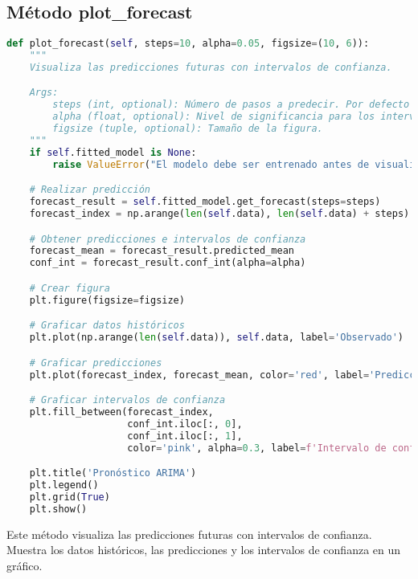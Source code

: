 \documentclass[12pt,letterpaper]{report}
\begin{document}
\subsection{Método plot\_forecast}
\begin{lstlisting}[language=python]
def plot_forecast(self, steps=10, alpha=0.05, figsize=(10, 6)):
    """
    Visualiza las predicciones futuras con intervalos de confianza.

    Args:
        steps (int, optional): Número de pasos a predecir. Por defecto es 10.
        alpha (float, optional): Nivel de significancia para los intervalos de confianza.
        figsize (tuple, optional): Tamaño de la figura.
    """
    if self.fitted_model is None:
        raise ValueError("El modelo debe ser entrenado antes de visualizar predicciones")

    # Realizar predicción
    forecast_result = self.fitted_model.get_forecast(steps=steps)
    forecast_index = np.arange(len(self.data), len(self.data) + steps)

    # Obtener predicciones e intervalos de confianza
    forecast_mean = forecast_result.predicted_mean
    conf_int = forecast_result.conf_int(alpha=alpha)

    # Crear figura
    plt.figure(figsize=figsize)

    # Graficar datos históricos
    plt.plot(np.arange(len(self.data)), self.data, label='Observado')

    # Graficar predicciones
    plt.plot(forecast_index, forecast_mean, color='red', label='Predicción')

    # Graficar intervalos de confianza
    plt.fill_between(forecast_index,
                     conf_int.iloc[:, 0],
                     conf_int.iloc[:, 1],
                     color='pink', alpha=0.3, label=f'Intervalo de confianza {(1 - alpha) * 100}%')

    plt.title('Pronóstico ARIMA')
    plt.legend()
    plt.grid(True)
    plt.show()
\end{lstlisting}

Este método visualiza las predicciones futuras con intervalos de confianza. Muestra los datos históricos, las predicciones y los intervalos de confianza en un gráfico.
\end{document}
